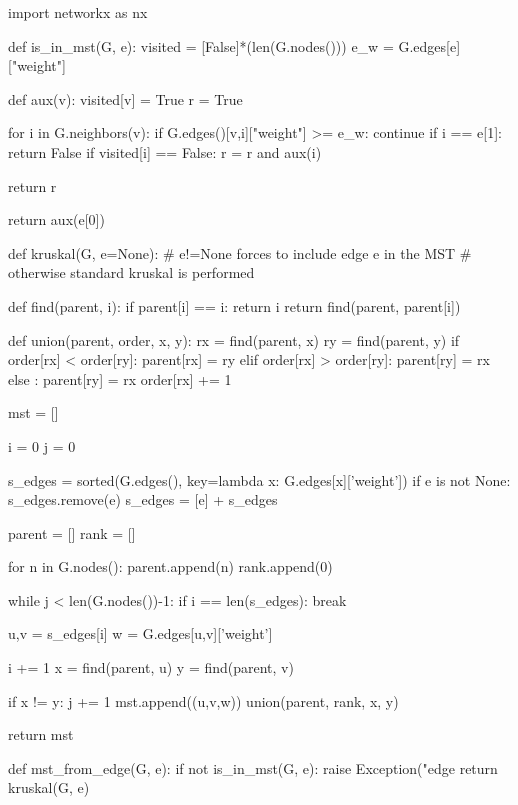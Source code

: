 \documentclass[paper=a4, fontsize=11pt]{scrartcl} %
\numberwithin{equation}{section} %
\numberwithin{figure}{section} %
\numberwithin{table}{section} %
\begin{document}
\begin{pycode}
import networkx as nx

def is_in_mst(G, e):
    visited = [False]*(len(G.nodes())) 
    e_w = G.edges[e]["weight"]
    
    def aux(v):
        visited[v] = True
        r = True
        
        for i in G.neighbors(v):
            if G.edges()[v,i]["weight"] >= e_w:
                continue
            if i == e[1]:
                return False
            if visited[i] == False: 
                r = r and aux(i)
        
        return r
    
    return aux(e[0])


def kruskal(G, e=None): 
    # e!=None forces to include edge e in the MST
    # otherwise standard kruskal is performed
    
    def find(parent, i):
        if parent[i] == i:
            return i
        return find(parent, parent[i])

    def union(parent, order, x, y):
        rx = find(parent, x)
        ry = find(parent, y)
        if order[rx] < order[ry]:
            parent[rx] = ry
        elif order[rx] > order[ry]:
            parent[ry] = rx
        else :
            parent[ry] = rx
            order[rx] += 1

    mst = []
    
    i = 0
    j = 0
    
    s_edges = sorted(G.edges(), key=lambda x: G.edges[x]['weight'])
    if e is not None:
        s_edges.remove(e)
        s_edges = [e] + s_edges
        
    parent = []
    rank = [] 

    for n in G.nodes(): 
        parent.append(n)
        rank.append(0)
  
    while j < len(G.nodes())-1: 
        if i == len(s_edges): break
        
        u,v = s_edges[i]
        w = G.edges[u,v]['weight']
        
        i += 1
        x = find(parent, u)
        y = find(parent, v)

        if x != y: 
            j += 1 
            mst.append((u,v,w))
            union(parent, rank, x, y)
    
    return mst
    
def mst_from_edge(G, e):
    if not is_in_mst(G, e):
        raise Exception("edge %
    return kruskal(G, e)
    
\end{pycode}
\end{document}
